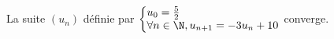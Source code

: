 La suite $(u_n)$ définie par $\left\{ \begin{array}{@{} l @{}} u_0 = \frac 52 \\ \forall n\in \N, u_{n+1}=-3u_{n}+10 \end{array} \right.$ converge.

\begin{reponses}
\end{reponses}

